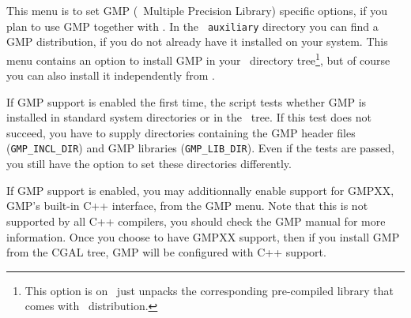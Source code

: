 This menu is to set GMP (\gnu\ Multiple Precision Library) specific
options, if you plan to use GMP together with \cgal . In the {\tt
  auxiliary} directory you can find a GMP distribution, if you do not
already have it installed on your system. This menu contains an option
to install GMP in your \cgal\ directory tree\footnote{This option is
  on \msvc\ just unpacks the corresponding pre-compiled library that
  comes with \cgal\ distribution.}, but of course you can also install
it independently from \cgal .

If GMP support is enabled the first time, the script tests whether GMP
is installed in standard system directories or in the \cgal\ tree. If
this test does not succeed, you have to supply directories containing
the GMP header files (\texttt{GMP\_INCL\_DIR})
and GMP libraries ({\tt GMP\_LIB\_DIR}).  Even
if the tests are passed, you still have the option to set these
directories differently.\bigskip

If GMP support is enabled, you may additionnally enable support for GMPXX,
GMP's built-in C++ interface, from the GMP menu.  Note that this is not
supported by all C++ compilers, you should check the GMP manual for more
information.  Once you choose to have GMPXX support, then if you install GMP
from the CGAL tree, GMP will be configured with C++ support.


